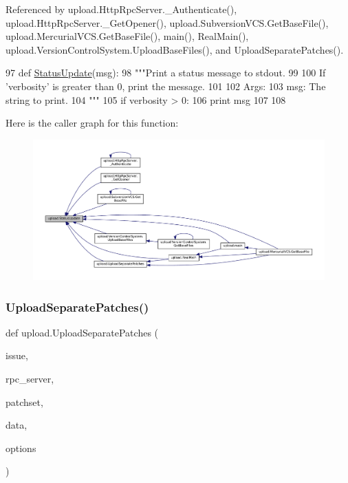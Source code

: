 Referenced by upload.\+Http\+Rpc\+Server.\+\_\+\+Authenticate(), upload.\+Http\+Rpc\+Server.\+\_\+\+Get\+Opener(), upload.\+Subversion\+V\+C\+S.\+Get\+Base\+File(), upload.\+Mercurial\+V\+C\+S.\+Get\+Base\+File(), main(), Real\+Main(), upload.\+Version\+Control\+System.\+Upload\+Base\+Files(), and Upload\+Separate\+Patches().


\begin{DoxyCode}
97 \textcolor{keyword}{def }\hyperlink{namespaceupload_a79ce84c196c018f3b0c7ff7a9b626b58}{StatusUpdate}(msg):
98   \textcolor{stringliteral}{"""Print a status message to stdout.}
99 \textcolor{stringliteral}{}
100 \textcolor{stringliteral}{  If 'verbosity' is greater than 0, print the message.}
101 \textcolor{stringliteral}{}
102 \textcolor{stringliteral}{  Args:}
103 \textcolor{stringliteral}{    msg: The string to print.}
104 \textcolor{stringliteral}{  """}
105   \textcolor{keywordflow}{if} verbosity > 0:
106     \textcolor{keywordflow}{print} msg
107 
108 
\end{DoxyCode}
Here is the caller graph for this function\+:
\nopagebreak
\begin{figure}[H]
\begin{center}
\leavevmode
\includegraphics[width=350pt]{namespaceupload_a79ce84c196c018f3b0c7ff7a9b626b58_icgraph}
\end{center}
\end{figure}
\mbox{\label{namespaceupload_a7ec83cb7f7bfb9109c19b6f91552b3ee}} 
\subsubsection{\texorpdfstring{Upload\+Separate\+Patches()}{UploadSeparatePatches()}}
{\footnotesize\ttfamily def upload.\+Upload\+Separate\+Patches (\begin{DoxyParamCaption}\item[{}]{issue,  }\item[{}]{rpc\+\_\+server,  }\item[{}]{patchset,  }\item[{}]{data,  }\item[{}]{options }\end{DoxyParamCaption})}

